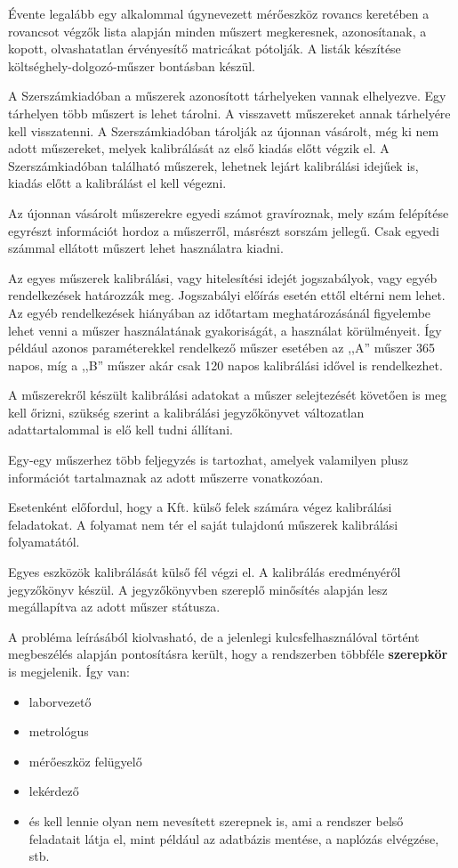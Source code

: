 \documentclass[a4paper,12pt]{report}
\begin{document}
Évente legalább egy alkalommal úgynevezett mérőeszköz rovancs keretében a
rovancsot végzők lista alapján minden műszert megkeresnek, azonosítanak, a kopott, 
olvashatatlan érvényesítő matricákat pótolják. A listák készítése 
költséghely-dolgozó-műszer bontásban készül.
 
A Szerszámkiadóban a műszerek azonosított tárhelyeken vannak elhelyezve. 
Egy tárhelyen több műszert is lehet tárolni. A visszavett műszereket annak 
tárhelyére kell visszatenni. A Szerszámkiadóban tárolják az újonnan vásárolt, 
még ki nem adott műszereket, melyek kalibrálását az első kiadás előtt végzik 
el. A Szerszámkiadóban található műszerek, lehetnek lejárt kalibrálási idejűek 
is, kiadás előtt a kalibrálást el kell végezni.

Az újonnan vásárolt műszerekre egyedi számot gravíroznak, mely szám felépítése 
egyrészt információt hordoz a műszerről, másrészt sorszám jellegű. Csak egyedi 
számmal ellátott műszert lehet használatra kiadni. 

Az egyes műszerek kalibrálási, vagy hitelesítési idejét jogszabályok, vagy egyéb
rendelkezések határozzák meg. Jogszabályi előírás esetén ettől eltérni nem 
lehet. Az egyéb rendelkezések hiányában az időtartam meghatározásánál figyelembe
lehet venni a műszer használatának gyakoriságát, a használat körülményeit.
Így például azonos paraméterekkel rendelkező műszer esetében az ,,A'' műszer
365 napos, míg a ,,B'' műszer akár csak 120 napos kalibrálási idővel is rendelkezhet.

A műszerekről készült kalibrálási adatokat a műszer selejtezését követően is 
meg kell őrizni, szükség szerint a kalibrálási jegyzőkönyvet változatlan 
adattartalommal is elő kell tudni állítani.

Egy-egy műszerhez több feljegyzés is tartozhat, amelyek valamilyen plusz 
információt tartalmaznak az adott műszerre vonatkozóan. 

Esetenként előfordul, hogy a Kft. külső felek számára végez kalibrálási 
feladatokat. A folyamat nem tér el saját tulajdonú műszerek kalibrálási 
folyamatától.

Egyes eszközök kalibrálását külső fél végzi el. A kalibrálás eredményéről jegyzőkönyv
készül. A jegyzőkönyvben szereplő minősítés alapján lesz megállapítva az adott műszer státusza.

A probléma leírásából kiolvasható, de a jelenlegi kulcsfelhasználóval történt megbeszélés alapján pontosításra került, hogy a rendszerben többféle \textbf{szerepkör} is megjelenik. Így van:
\begin{itemize}
	\item laborvezető
	\item metrológus
	\item mérőeszköz felügyelő
	\item lekérdező
	\item és kell lennie olyan nem nevesített szerepnek is, ami a rendszer belső 
	feladatait látja el, mint például az adatbázis mentése, a naplózás elvégzése, 
	stb.
\end{itemize}
\end{document}
